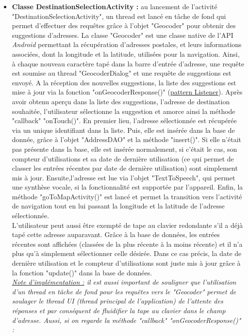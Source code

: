 \begin{itemize}
\item \textbf{Classe DestinationSelectionActivity :} au lancement de l'activité "DestinationSelectionActivity", un thread est lancé en tâche de fond qui permet d'effectuer des requêtes grâce à l'objet "Geocoder" pour obtenir des suggestions d'adresses. La classe "Geocoder" est une classe native de l'API \textit{Android} permettant la récupération d'adresses postales, et leurs informations associées, dont la longitude et la latitude, utilisées pour la navigation. Ainsi, à chaque nouveau caractère tapé dans la barre d'entrée d'adresse, une requête est soumise au thread "GeocoderDialog" et une requête de suggestions est envoyé. A la réception des nouvelles suggestions, la liste des suggestions est mise à jour via la fonction "onGeocoderResponse()" (\underline{pattern Listener}). Après avoir obtenu aperçu dans la liste des suggestions, l'adresse de destination souhaitée, l'utilisateur sélectionne la suggestion et amorce ainsi la méthode "callback" "onTouch()". En premier lieu, l'adresse sélectionnée est récupérée via un unique identifiant dans la liste. Puis, elle est insérée dans la base de donnée, grâce à l'objet "AddressDAO" et la méthode "insert()". Si elle n'était pas présente dans la base, elle est insérée normalement, si c'était le cas, son compteur d'utilisations et sa date de dernière utilisation (ce qui permet de classer les entrées récentes par date de dernière utilisation) sont simplement mis à jour. Ensuite,l'adresse est lue via l'objet "TextToSpeech", qui permet une synthèse vocale, si la fonctionnalité est supportée par l'appareil. Enfin, la méthode "goToMapActivity()" est lancé et permet la transition vers l'activité de navigation tout en lui passant la longitude et la latitude de l'adresse sélectionnée.\\
L'utilisateur peut aussi être exempté de tape au clavier redondante s'il a déjà tapé cette adresse auparavant. Grâce à la base de données, les entrées récentes sont affichées (classées de la plus récente à la moins récente) et il n'a plus qu'à simplement sélectionner celle désirée. Dans ce cas précis, la date de dernière utilisation et le compteur d'utilisations sont juste mis à jour grâce à la fonction "update()" dans la base de données.\\
{\it \underline{Note d'implémentation :} il est aussi important de souligner que l'utilisation d'un thread en tâche de fond pour les requêtes vers le "Geocoder" permet de soulager le thread UI (thread principal de l'application) de l'attente des réponses et par conséquent de fluidifier la tape au clavier dans le champ d'adresse. Aussi, si on regarde la méthode "callback" "onGeocoderResponse()" :}


\end{itemize}
